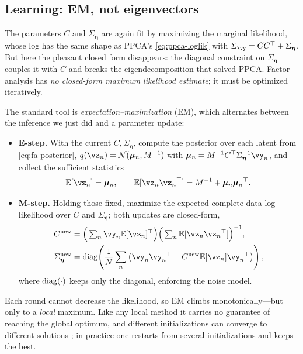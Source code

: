 \documentclass[11pt]{article}
\theoremstyle{plain}
\theoremstyle{definition}
\theoremstyle{remark}
\theoremstyle{definition}
\newcommand{\E}{\mathbb{E}}
\newcommand{\veta}{\bm{\eta}}
\newcommand{\Normal}{\mathcal{N}}
\newcommand{\vmu}{\bm{\mu}}
\begin{document}
\subsection{Learning: EM, not eigenvectors}

The parameters $C$ and $\Sigma_{\veta}$ are again fit by maximizing the marginal
likelihood, whose log has the same shape as PPCA's \eqref{eq:ppca-loglik} with
$\Sigma_{\vy} = C C\trp + \Sigma_{\veta}$. But here the pleasant closed form
disappears: the diagonal constraint on $\Sigma_{\veta}$ couples it with $C$ and
breaks the eigendecomposition that solved PPCA. Factor analysis has \emph{no
closed-form maximum likelihood estimate}; it must be optimized iteratively.

The standard tool is \emph{expectation--maximization} (EM), which alternates
between the inference we just did and a parameter update:
\begin{itemize}
    \item \textbf{E-step.} With the current $C, \Sigma_{\veta}$, compute the
    posterior over each latent from \eqref{eq:fa-posterior}, $q(\vz_n) =
    \Normal(\vmu_n, M^{-1})$ with $\vmu_n = M^{-1}C\trp\Sigma_{\veta}^{-1}\vy_n$,
    and collect the sufficient statistics
    \begin{equation}
        \E[\vz_n] = \vmu_n, \qquad
        \E[\vz_n\vz_n\trp] = M^{-1} + \vmu_n\vmu_n\trp .
    \end{equation}
    \item \textbf{M-step.} Holding those fixed, maximize the expected
    complete-data log-likelihood over $C$ and $\Sigma_{\veta}$; both updates are
    closed-form,
    \begin{align}
        C^{\text{new}} &= \Big(\textstyle\sum_n \vy_n \E[\vz_n]\trp\Big)
                          \Big(\textstyle\sum_n \E[\vz_n\vz_n\trp]\Big)^{-1},
                          \label{eq:fa-Mstep-C}\\
        \Sigma_{\veta}^{\text{new}} &= \diag\!\left(\frac{1}{N}\sum_n
            \big(\vy_n\vy_n\trp - C^{\text{new}}\E[\vz_n]\vy_n\trp\big)\right),
            \label{eq:fa-Mstep-S}
    \end{align}
    where $\operatorname{diag}(\cdot)$ keeps only the diagonal, enforcing the noise model.
\end{itemize}
Each round cannot decrease the likelihood, so EM climbs monotonically---but only
to a \emph{local} maximum. Like any local method it carries no guarantee of
reaching the global optimum, and different initializations can converge to
different solutions \parencite{Bishop2006-to}; in practice one restarts from
several initializations and keeps the best.
\end{document}
